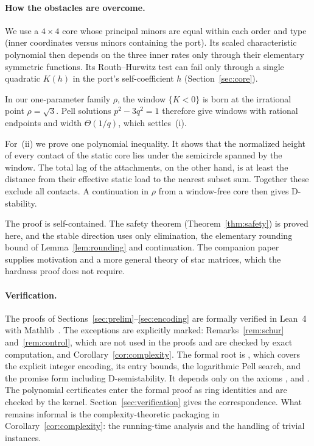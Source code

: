 \documentclass[11pt,a4paper]{article}
\theoremstyle{plain}
\theoremstyle{definition}
\theoremstyle{remark}
\begin{document}
\paragraph{How the obstacles are overcome.}
We use a $4\times4$ core whose principal minors are equal within each order and
type (inner coordinates versus minors containing the port). Its scaled characteristic
polynomial then depends on the three inner rates only through their elementary
symmetric functions. Its Routh--Hurwitz test can fail only through a single quadratic
$K(h)$ in the port's self-coefficient $h$ (Section~\ref{sec:core}).

In our one-parameter family $\rho$, the window $\{K<0\}$ is born at the irrational
point $\rho=\sqrt3$. Pell solutions $p^2-3q^2=1$ therefore give windows with rational
endpoints and width $\Theta(1/q)$, which settles~(i).

For~(ii) we prove one polynomial inequality. It shows that the normalized height of
every contact of the static core lies under the semicircle spanned by the window. The
total lag of the attachments, on the other hand, is at least the distance from their
effective static load to the nearest subset sum. Together these exclude all contacts.
A continuation in $\rho$ from a window-free core then gives D-stability.

The proof is self-contained. The safety theorem (Theorem~\ref{thm:safety}) is proved
here, and the stable direction uses only elimination, the elementary rounding bound of
Lemma~\ref{lem:rounding} and continuation. The companion paper~\cite{companion2026}
supplies motivation and a more general theory of star matrices, which the hardness
proof does not require.

\paragraph{Verification.}
The proofs of Sections~\ref{sec:prelim}--\ref{sec:encoding} are formally verified in
Lean~4~\cite{demoura2021} with Mathlib~\cite{mathlib2020}. The exceptions are
explicitly marked: Remarks~\ref{rem:schur} and~\ref{rem:control}, which are not used in
the proofs and are checked by exact computation, and Corollary~\ref{cor:complexity}. The formal
root is , which covers the explicit integer
encoding, its entry bounds, the logarithmic Pell search, and the promise form including
D-semistability. It depends only on the axioms , 
and . The polynomial certificates enter the formal proof as ring
identities and are checked by the kernel. Section~\ref{sec:verification} gives the
correspondence. What remains informal is the complexity-theoretic packaging in
Corollary~\ref{cor:complexity}: the running-time analysis and the handling of trivial
instances.
\end{document}
